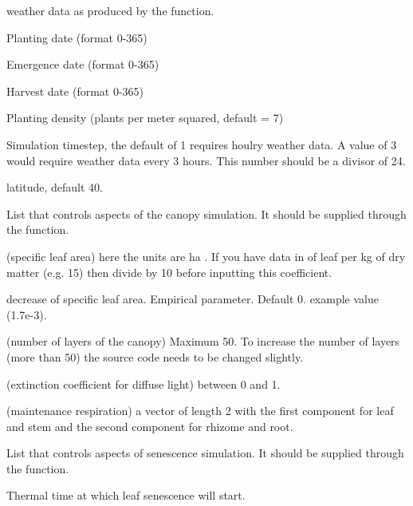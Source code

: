 \documentclass[letterpaper]{book}
\begin{document}
\begin{Arguments}
\begin{ldescription}
\item[\code{WetDat}] weather data as produced by the
 function.

\item[\code{plant.day}] Planting date (format 0-365)

\item[\code{emerge.day}] Emergence date (format 0-365)

\item[\code{harvest.day}] Harvest date (format 0-365)

\item[\code{plant.density}] Planting density (plants per meter
squared, default = 7)

\item[\code{timestep}] Simulation timestep, the default of 1
requires houlry weather data. A value of 3 would require
weather data every 3 hours.  This number should be a
divisor of 24.

\item[\code{lat}] latitude, default 40.

\item[\code{canopyControl}] List that controls aspects of the
canopy simulation. It should be supplied through the
 function.

 (specific leaf area) here the units are ha
.  If you have data in  of leaf per
kg of dry matter (e.g. 15) then divide by 10 before
inputting this coefficient.

 decrease of specific leaf area. Empirical
parameter. Default 0. example value (1.7e-3).

 (number of layers of the canopy) Maximum
50. To increase the number of layers (more than 50) the
 source code needs to be changed slightly.

 (extinction coefficient for diffuse light)
between 0 and 1.

 (maintenance respiration) a vector of length
2 with the first component for leaf and stem and the
second component for rhizome and root.

\item[\code{caneSeneControl}] List that controls aspects of
senescence simulation. It should be supplied through the
 function.

 Thermal time at which leaf senescence will
start.


\end{ldescription}
\end{Arguments}
\end{document}
